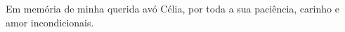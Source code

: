 \begin{dedicatoria}
 \vspace*{\fill}
 \noindent
  \raggedleft
 \begin{minipage}{.54\textwidth}
   Em memória de minha querida avó Célia, por toda a sua paciência, carinho e amor incondicionais.
 \end{minipage}
\end{dedicatoria}
